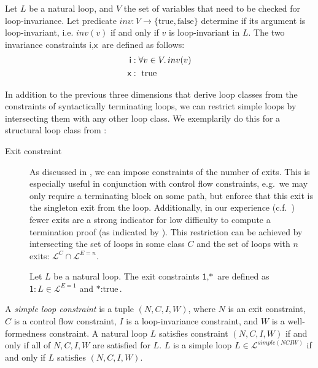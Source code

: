 \begin{description}
    \begin{definition}
        Let $L$ be a natural loop, and $V$ the set of variables that need to be checked for loop-invariance. Let predicate $inv: V \rightarrow \{\text{true}, \text{false}\}$ determine if its argument is loop-invariant, i.e. $inv(v)$ if and only if $v$ is loop-invariant in $L$. The two invariance constraints $\textsf{i}, \textsf{x}$ are defined as follows:
    \begin{align*}
        \textsf{i}&: \forall v \in V \ldotp inv(v) \\
        \textsf{x}&: \text{ true}
    \end{align*}
    \end{definition}
\end{description}

In addition to the previous three dimensions that derive loop classes from the constraints of syntactically terminating loops, we can restrict simple loops by intersecting them with any other loop class. We exemplarily do this for a structural loop class from :

\begin{description}
    \item[Exit constraint] As discussed in , we can impose constraints of the number of exits. This is especially useful in conjunction with control flow constraints, e.g.\ we may only require a terminating block on some path, but enforce that this exit is the singleton exit from the loop. Additionally, in our experience (c.f.\ ) fewer exits are a strong indicator for low difficulty to compute a termination proof (as indicated by \loopus{}). This restriction can be achieved by intersecting the set of loops in some class $C$ and the set of loops with $n$ exits: $\mathcal{L}^C \cap \mathcal{L}^{E=n}$.
    \begin{definition}
        Let $L$ be a natural loop. The exit constraints $\textsf{1}, \textsf{*}$ are defined as $\textsf{1}: L \in \mathcal{L}^{E=1}$ and $\textsf{*}: \text{true}$.
    \end{definition}
\end{description}

\begin{definition}
A \emph{simple loop constraint} is a tuple $(N, C, I, W)$, where $N$ is an exit constraint, $C$ is a control flow constraint, $I$ is a loop-invariance constraint, and $W$ is a well-formedness constraint. A natural loop $L$ satisfies constraint $(N, C, I, W)$ if and only if all of $N, C, I, W$ are satisfied for $L$. $L$ is a simple loop $L \in \mathcal{L}^{simple(NCIW)}$ if and only if $L$ satisfies $(N, C, I, W)$.
\end{definition}

